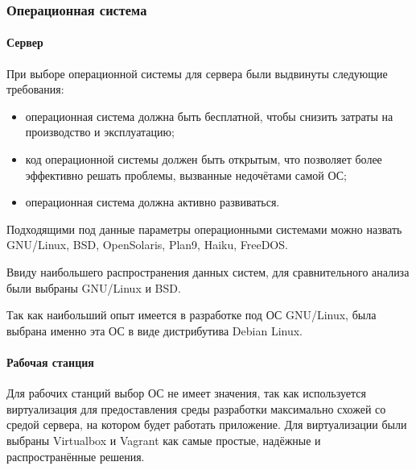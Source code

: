 \subsubsection{Операционная система}

\paragraph{Сервер}

При выборе операционной системы для сервера были выдвинуты следующие требования:
\begin{itemize}
\item операционная система должна быть бесплатной, чтобы снизить затраты на производство и эксплуатацию;
\item код операционной системы должен быть открытым, что позволяет более эффективно решать проблемы, вызванные недочётами самой ОС;
\item операционная система должна активно развиваться.
\end{itemize}

Подходящими под данные параметры операционными системами можно назвать GNU/Linux, BSD, OpenSolaris, Plan9, Haiku, FreeDOS.

Ввиду наибольшего распространения данных систем, для сравнительного анализа были выбраны GNU/Linux и BSD.

Так как наибольший опыт имеется в разработке под ОС GNU/Linux, была выбрана именно эта ОС в виде дистрибутива Debian Linux.

\paragraph{Рабочая станция}

Для рабочих станций выбор ОС не имеет значения, так как используется виртуализация для предоставления среды разработки максимально схожей со средой сервера, на котором будет работать приложение. Для виртуализации были выбраны Virtualbox и Vagrant как самые простые, надёжные и распространённые решения.
